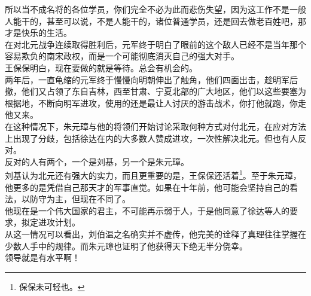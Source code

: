 \begin{multicols}{\theparacolNo}
所以当不成名将的各位学员，你们完全不必为此而悲伤失望，因为这工作不是一般人能干的，甚至可以说，不是人能干的，诸位普通学员，还是回去做老百姓吧，那才是快乐的生活。\\

在对北元战争连续取得胜利后，元军终于明白了眼前的这个敌人已经不是当年那个容易欺负的南宋政权，而是一个可能彻底消灭自己的强大对手。\\

王保保明白，现在要做的就是等待。总会有机会的。\\

两年后，一直龟缩的元军终于慢慢向明朝伸出了触角，他们四面出击，趁明军后撤，他们又占领了东自吉林，西至甘肃、宁夏北部的广大地区，他们以这些要塞为根据地，不断向明军进攻，使用的还是最让人讨厌的游击战术，你打他就跑，你走他又来。\\

在这种情况下，朱元璋与他的将领们开始讨论采取何种方式对付北元，在应对方法上出现了分歧，包括徐达在内的大多数人赞成进攻，一次性解决北元。但也有人反对。\\

反对的人有两个，一个是刘基，另一个是朱元璋。\\

刘基认为北元还有强大的实力，而且更重要的是，王保保还活着\footnote{保保未可轻也。}。至于朱元璋，他更多的是凭借自己那天才的军事直觉。如果在十年前，他可能会坚持自己的看法，以防守为主，但现在不同了。\\

他现在是一个伟大国家的君主，不可能再示弱于人，于是他同意了徐达等人的要求，拟定进攻计划。\\

从这一情况可以看出，刘伯温之名确实并不虚传，他完美的诠释了真理往往掌握在少数人手中的规律。而朱元璋也证明了他获得天下绝无半分侥幸。\\

领导就是有水平啊！\\
\ifnum{}
	\end{multicols}
\fi
\newpage
